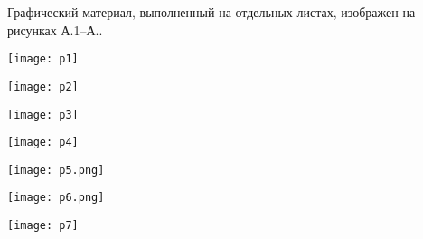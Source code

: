 
Графический материал, выполненный на отдельных листах,
изображен на рисунках А.1--А..
\setcounter{числоПлакатов}{0}

\renewcommand{\thefigure}{А.\arabic{figure}} %

\begin{landscape}

\begin{плакат}
    \texttt{[image: p1]}
    \label{pl1:image}
\end{плакат}

\begin{плакат}
    \texttt{[image: p2]}
    \label{pl2:image}
\end{плакат}

\begin{плакат}
    \texttt{[image: p3]}
    \label{pl3:image}
\end{плакат}

\begin{плакат}
    \texttt{[image: p4]}
    \label{pl4:image}
\end{плакат}

\begin{плакат}
    \texttt{[image: p5.png]}
    \label{pl5:image}
\end{плакат}

\begin{плакат}
    \texttt{[image: p6.png]}
    \label{pl6:image}
\end{плакат}

\begin{плакат}
    \texttt{[image: p7]}
    \label{pl7:image}
\end{плакат}

\end{landscape}
